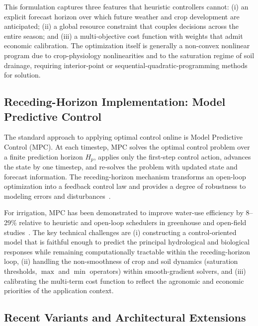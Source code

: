 This formulation captures three features that heuristic controllers
cannot: (i) an explicit forecast horizon over which future weather and
crop development are anticipated; (ii) a global resource constraint
that couples decisions across the entire season; and (iii) a
multi-objective cost function with weights that admit economic
calibration. The optimization itself is generally a non-convex
nonlinear program due to crop-physiology nonlinearities and to the
saturation regime of soil drainage, requiring interior-point or
sequential-quadratic-programming methods for solution.

\subsection{Receding-Horizon Implementation: Model Predictive Control}

The standard approach to applying optimal control online is Model
Predictive Control (MPC). At each timestep, MPC solves the optimal
control problem over a finite prediction horizon $H_p$, applies only
the first-step control action, advances the state by one timestep,
and re-solves the problem with updated state and forecast information.
The receding-horizon mechanism transforms an open-loop optimization
into a feedback control law and provides a degree of robustness to
modeling errors and disturbances~\cite{LopezJimenez2022,Sharma2025}.

For irrigation, MPC has been demonstrated to improve water-use
efficiency by 8--29\% relative to heuristic and open-loop schedulers
in greenhouse and open-field studies~\cite{LopezJimenez2022,Mahmud2026}.
The key technical challenges are (i) constructing a control-oriented
model that is faithful enough to predict the principal hydrological
and biological responses while remaining computationally tractable
within the receding-horizon loop, (ii) handling the non-smoothness of
crop and soil dynamics (saturation thresholds, $\max$ and $\min$
operators) within smooth-gradient solvers, and (iii) calibrating the
multi-term cost function to reflect the agronomic and economic
priorities of the application context.

\subsection{Recent Variants and Architectural Extensions}

